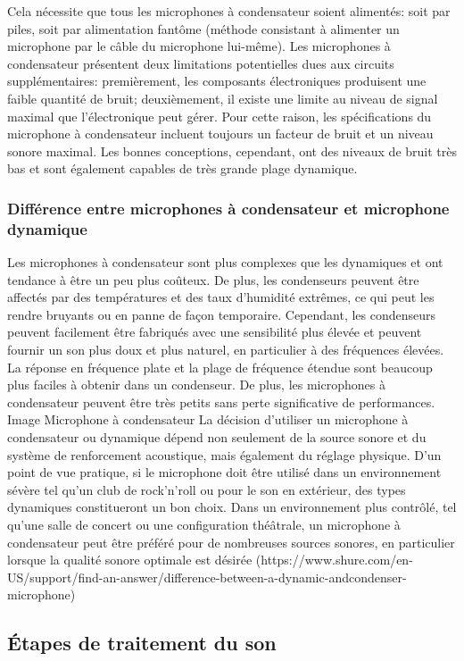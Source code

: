 \documentclass[a4paper, 12pt]{book}
\begin{document}
Cela nécessite que tous les microphones à condensateur soient alimentés: soit par piles, soit par alimentation fantôme (méthode consistant à alimenter un microphone par le câble du microphone lui-même). Les microphones à condensateur présentent deux limitations potentielles dues aux circuits supplémentaires: premièrement, les composants électroniques produisent une faible quantité de bruit; deuxièmement, il existe une limite au niveau de signal maximal que l’électronique peut gérer. Pour cette raison, les spécifications du microphone à condensateur incluent toujours un facteur de bruit et un niveau sonore maximal. Les bonnes conceptions, cependant, ont des niveaux de bruit très bas et sont également capables de très grande plage dynamique.

\subsubsection{Différence entre microphones à condensateur et microphone dynamique}

Les microphones à condensateur sont plus complexes que les dynamiques et ont tendance à être un peu plus coûteux. De plus, les condenseurs peuvent être affectés par des températures et des taux d'humidité extrêmes, ce qui peut les rendre bruyants ou en panne de façon temporaire. Cependant, les condenseurs peuvent facilement être fabriqués avec une sensibilité plus élevée et peuvent fournir un son plus doux et plus naturel, en particulier à des fréquences élevées. La réponse en fréquence plate et la plage de fréquence étendue sont beaucoup plus faciles à obtenir dans un condenseur. De plus, les microphones à condensateur peuvent être très petits sans perte significative de performances. Image Microphone à condensateur La décision d’utiliser un microphone à condensateur ou dynamique dépend non seulement de la source sonore et du système de renforcement acoustique, mais également du réglage physique. D'un point de vue pratique, si le microphone doit être utilisé dans un environnement sévère tel qu'un club de rock'n'roll ou pour le son en extérieur, des types dynamiques constitueront un bon choix. Dans un environnement plus contrôlé, tel qu'une salle de concert ou une configuration théâtrale, un microphone à condensateur peut être préféré pour de nombreuses sources sonores, en particulier lorsque la qualité sonore optimale est désirée (https://www.shure.com/en-US/support/find-an-answer/difference-between-a-dynamic-andcondenser-microphone)

\subsection{Étapes de traitement du son}
\end{document}
